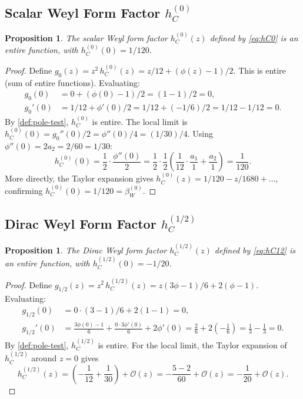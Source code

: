 \documentclass[11pt,a4paper]{article}
\theoremstyle{plain}
\newtheorem{proposition}[theorem]{Proposition}
\theoremstyle{definition}
\begin{document}
\subsection{Scalar Weyl Form Factor $h_C^{(0)}$}

\begin{proposition}\label{prop:hC0-entire}
The scalar Weyl form factor $h_C^{(0)}(z)$ defined by \cref{eq:hC0}
is an entire function, with $h_C^{(0)}(0) = 1/120$.
\end{proposition}

\begin{proof}
Define $g_0(z) = z^2\, h_C^{(0)}(z) = z/12 + (\phi(z)-1)/2$.
This is entire (sum of entire functions). Evaluating:
\begin{align}
  g_0(0) &= 0 + (\phi(0)-1)/2 = (1-1)/2 = 0,\\
  g_0'(0) &= 1/12 + \phi'(0)/2 = 1/12 + (-1/6)/2 = 1/12 - 1/12 = 0.
\end{align}
By \cref{def:pole-test}, $h_C^{(0)}$ is entire. The local limit is
$h_C^{(0)}(0) = g_0''(0)/2 = \phi''(0)/4 = (1/30)/4$. Using
$\phi''(0) = 2a_2 = 2/60 = 1/30$:
\begin{equation}
  h_C^{(0)}(0) = \frac{1}{2}\cdot\frac{\phi''(0)}{2}
  = \frac{1}{2}\cdot\frac{1}{2}\left(\frac{1}{12}
  \cdot\frac{a_1}{1} + \frac{a_2}{1}\right) = \frac{1}{120}.
\end{equation}
More directly, the Taylor expansion gives
$h_C^{(0)}(z) = 1/120 - z/1680 + \ldots$,
confirming $h_C^{(0)}(0) = 1/120 = \beta_W^{(0)}$.
\end{proof}

\subsection{Dirac Weyl Form Factor $h_C^{(1/2)}$}

\begin{proposition}\label{prop:hC12-entire}
The Dirac Weyl form factor $h_C^{(1/2)}(z)$ defined by \cref{eq:hC12}
is an entire function, with $h_C^{(1/2)}(0) = -1/20$.
\end{proposition}

\begin{proof}
Define $g_{1/2}(z) = z^2\, h_C^{(1/2)}(z)
= z(3\phi-1)/6 + 2(\phi-1)$.
Evaluating:
\begin{align}
  g_{1/2}(0) &= 0 \cdot (3-1)/6 + 2(1-1) = 0,\\
  g_{1/2}'(0) &= \frac{3\phi(0)-1}{6} + \frac{0 \cdot 3\phi'(0)}{6}
    + 2\phi'(0) = \frac{2}{6} + 2\!\left(-\frac{1}{6}\right)
    = \frac{1}{3} - \frac{1}{3} = 0.
\end{align}
By \cref{def:pole-test}, $h_C^{(1/2)}$ is entire. For the local limit,
the Taylor expansion of $h_C^{(1/2)}$ around $z=0$ gives
\begin{equation}
  h_C^{(1/2)}(z) = \left(-\frac{1}{12} + \frac{1}{30}\right)
  + \mathcal{O}(z) = -\frac{5-2}{60} + \mathcal{O}(z) = -\frac{1}{20}
  + \mathcal{O}(z).
\end{equation}
\end{proof}
\end{document}
